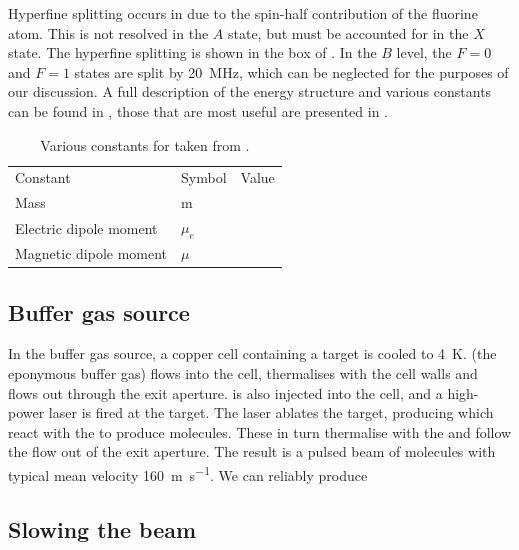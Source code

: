Hyperfine splitting occurs in \CaF{} due to the spin-half contribution of the
fluorine atom. This is not resolved in the $A$ state, but must be accounted for
in the $X$ state. The hyperfine splitting is shown in the box of
. In the $B$ level, the $F=0$ and $F=1$ states
are split by \SI{20}{\mega\hertz}, which can be neglected for the purposes of
our discussion. A full description of the \CaF{} energy structure and various
constants can be found in , those that are most useful
are presented in .

\begin{table}
  \centering
\begin{tabular}{lll}
  Constant & Symbol & Value \\
  Mass & m & \\
  Electric dipole moment & $\mu_e$ & \\
  Magnetic dipole moment & $\mu$ & \\
 \hline
\end{tabular}
\caption{
  Various constants for \CaF{} taken from .
  }
  \label{overview:table:lasers}
\end{table}

\subsection*{Buffer gas source}

In the buffer gas source, a copper cell containing a  target is
cooled to \SI{4}{\kelvin}.  (the eponymous buffer gas) flows into
the cell, thermalises with the cell walls and flows out through the exit
aperture.  is also injected into the cell, and a high-power 
laser is fired at the target. The laser ablates the  target,
producing  which react with the  to produce \CaF{}
molecules. These in turn thermalise with the  and follow the flow
out of the exit aperture.  The result is a pulsed beam of \CaF{} molecules with
typical mean velocity \SI{160}{\meter\per\second}. We can reliably produce 

\subsection*{Slowing the beam}

